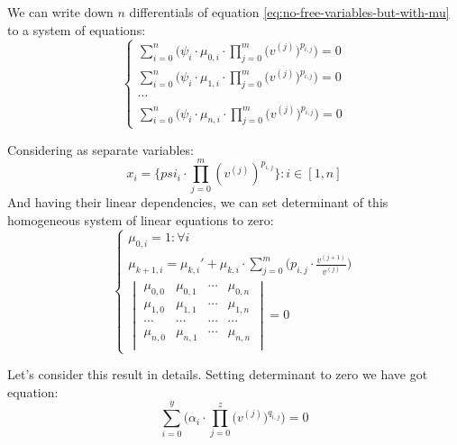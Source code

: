 \documentclass[a4paper, 11pt, oneside]{book}
\begin{document}
We can write down $n$ differentials of equation \ref{eq:no-free-variables-but-with-mu} to a system of equations:
\begin{equation}
  \begin{cases}
    \displaystyle \sum_{i = 0}^n\bigg(\psi_i \cdot \mu_{0, i} \cdot \prod_{j=0}^m \Big(v^{(j)}\Big)^{p_{i, j}}\bigg) = 0 \\
    \displaystyle \sum_{i = 0}^n\bigg(\psi_i \cdot \mu_{1, i} \cdot \prod_{j=0}^m \Big(v^{(j)}\Big)^{p_{i, j}}\bigg) = 0 \\
    \displaystyle \cdots \\
    \displaystyle \sum_{i = 0}^n\bigg(\psi_i \cdot \mu_{n, i} \cdot \prod_{j=0}^m \Big(v^{(j)}\Big)^{p_{i, j}}\bigg) = 0
  \end{cases}
\end{equation}

Considering as separate variables:
\begin{equation}
  x_i = \bigg\{psi_i \cdot \prod_{j=0}^m (v^{(j)})^{p_{i, j}}\bigg\}: i \in [1, n]
\end{equation}
And having their linear dependencies, we can set determinant of this homogeneous system of linear equations to zero:
\begin{equation}\label{eq:determinant-of-mu}
  \begin{cases}
    \displaystyle
    \mu_{0, i} = 1: \forall i \\
    \displaystyle \mu_{k + 1, i} = \mu_{k, i}' + \mu_{k, i} \cdot \sum_{j = 0}^m\Big(p_{i, j} \cdot \frac{v^{(j + 1)}}{v^{(j)}}\Big) \\
    \begin{vmatrix}
      \mu_{0, 0} & \mu_{0, 1} & \cdots & \mu_{0, n} \\
      \mu_{1, 0} & \mu_{1, 1} & \cdots & \mu_{1, n} \\
      \cdots & \cdots & \cdots& \cdots \\
      \mu_{n, 0} & \mu_{n, 1} & \cdots & \mu_{n, n} \\
    \end{vmatrix} = 0
  \end{cases}
\end{equation}

Let's consider this result in details. Setting determinant to zero we have got equation:
\begin{equation}\label{eq:universal-form-short}
  \sum_{i = 0}^y\bigg(\alpha_i \cdot \prod_{j=0}^z \Big(v^{(j)}\Big)^{q_{i, j}}\bigg) = 0
\end{equation}
\end{document}
